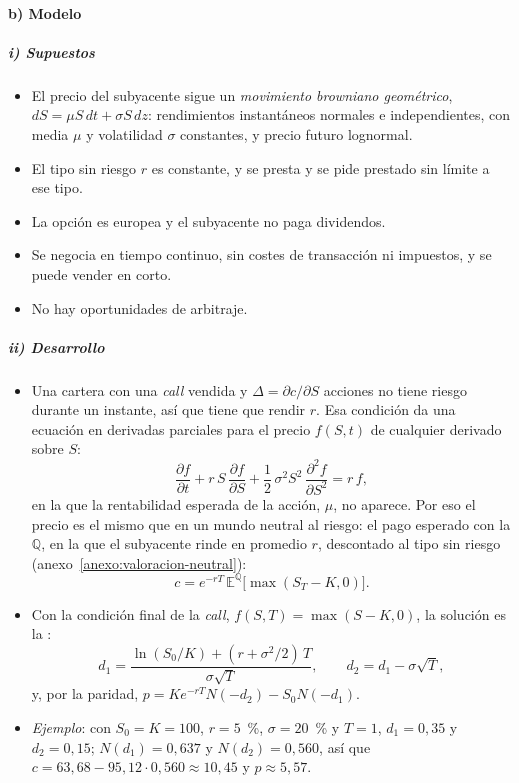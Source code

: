 \documentclass[11pt]{article}
\begin{document}
\paragraph{b) Modelo}

\subparagraph{i) Supuestos}

\begin{itemize}
\item El precio del subyacente sigue un \emph{movimiento browniano geométrico}, $dS=\mu S\,dt+\sigma S\,dz$: rendimientos instantáneos normales e independientes, con media $\mu$ y volatilidad $\sigma$ constantes, y precio futuro lognormal.
\item El tipo sin riesgo $r$ es constante, y se presta y se pide prestado sin límite a ese tipo.
\item La opción es europea y el subyacente no paga dividendos.
\item Se negocia en tiempo continuo, sin costes de transacción ni impuestos, y se puede vender en corto.
\item No hay oportunidades de arbitraje.
\end{itemize}

\subparagraph{ii) Desarrollo}

\begin{itemize}
\item Una cartera con una \emph{call} vendida y $\Delta=\partial c/\partial S$ acciones no tiene riesgo durante un instante, así que tiene que rendir $r$. Esa condición da una ecuación en derivadas parciales para el precio $f(S,t)$ de cualquier derivado sobre $S$\nocite{BlackScholes1973Pricing}:
  \begin{equation}\label{eq:edp-bs}
  \frac{\partial f}{\partial t}+r\,S\,\frac{\partial f}{\partial S}+\frac{1}{2}\,\sigma^2S^2\,\frac{\partial^2f}{\partial S^2}=r\,f,
  \end{equation}
  en la que la rentabilidad esperada de la acción, $\mu$, no aparece. Por eso el precio es el mismo que en un mundo neutral al riesgo: el pago esperado con la  $\mathbb{Q}$, en la que el subyacente rinde en promedio $r$, descontado al tipo sin riesgo (anexo~\ref{anexo:valoracion-neutral}):
  \begin{equation}\label{eq:neutral-riesgo}
  c=e^{-rT}\,\mathbb{E}^{\mathbb{Q}}\big[\max(S_T-K,0)\big].
  \end{equation}
\item Con la condición final de la \emph{call}, $f(S,T)=\max(S-K,0)$, la solución es la :
  \begin{equation}\label{eq:d1-d2}
  d_1=\frac{\ln(S_0/K)+(r+\sigma^2/2)\,T}{\sigma\sqrt{T}},\qquad d_2=d_1-\sigma\sqrt{T},
  \end{equation}
  y, por la paridad, $p=Ke^{-rT}N(-d_2)-S_0N(-d_1)$.
\item \emph{Ejemplo}: con $S_0=K=100$, $r=5$~\%, $\sigma=20$~\% y $T=1$, $d_1=0{,}35$ y $d_2=0{,}15$; $N(d_1)=0{,}637$ y $N(d_2)=0{,}560$, así que $c=63{,}68-95{,}12\cdot0{,}560\approx10{,}45$ y $p\approx5{,}57$.
\end{itemize}
\end{document}
